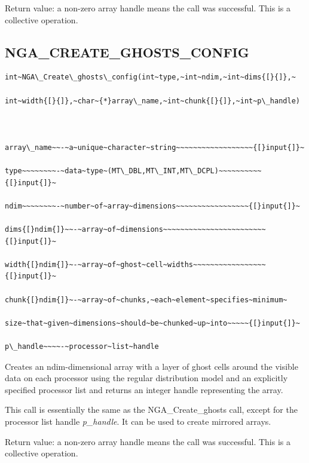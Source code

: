 Return value: a non-zero array handle means the call was successful.
This is a collective operation.


\subsection*{\label{sub:NGA_CREATE_GHOSTS_CONFIG}NGA\_CREATE\_GHOSTS\_CONFIG}
\begin{verbatim}
int~NGA\_Create\_ghosts\_config(int~type,~int~ndim,~int~dims{[}{]},~

int~width{[}{]},~char~{*}array\_name,~int~chunk{[}{]},~int~p\_handle)



array\_name~~-~a~unique~character~string~~~~~~~~~~~~~~~~~~{[}input{]}~

type~~~~~~~~-~data~type~(MT\_DBL,MT\_INT,MT\_DCPL)~~~~~~~~~~{[}input{]}~

ndim~~~~~~~~-~number~of~array~dimensions~~~~~~~~~~~~~~~~~{[}input{]}~

dims{[}ndim{]}~~-~array~of~dimensions~~~~~~~~~~~~~~~~~~~~~~~~{[}input{]}~

width{[}ndim{]}~-~array~of~ghost~cell~widths~~~~~~~~~~~~~~~~~{[}input{]}~

chunk{[}ndim{]}~-~array~of~chunks,~each~element~specifies~minimum~

size~that~given~dimensions~should~be~chunked~up~into~~~~~{[}input{]}~

p\_handle~~~~-~processor~list~handle
\end{verbatim}
Creates an ndim-dimensional array with a layer of ghost cells around
the visible data on each processor using the regular distribution
model and an explicitly specified processor list and returns an integer
handle representing the array.

This call is essentially the same as the NGA\_Create\_ghosts call,
except for the processor list handle \emph{p\_handle}. It can be used
to create mirrored arrays.

Return value: a non-zero array handle means the call was successful.
This is a collective operation. 


